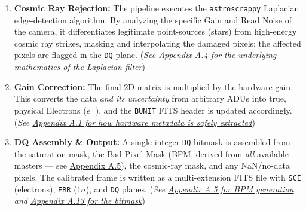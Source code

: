 \documentclass[11pt,a4paper]{article}
\begin{document}
\begin{enumerate}
    \item \textbf{Cosmic Ray Rejection:} The pipeline executes the \texttt{astroscrappy} Laplacian edge-detection algorithm. By analyzing the specific Gain and Read Noise of the camera, it differentiates legitimate point-sources (stars) from high-energy cosmic ray strikes, masking and interpolating the damaged pixels; the affected pixels are flagged in the \texttt{DQ} plane. (\textit{See \hyperref[app:cosmic]{Appendix A.4 for the underlying mathematics of the Laplacian filter}})
    \item \textbf{Gain Correction:} The final 2D matrix is multiplied by the hardware gain. This converts the data \emph{and its uncertainty} from arbitrary ADUs into true, physical Electrons ($e^-$), and the \texttt{BUNIT} FITS header is updated accordingly. (\textit{See \hyperref[app:adapter]{Appendix A.1 for how hardware metadata is safely extracted}})
    \item \textbf{DQ Assembly \& Output:} A single integer \texttt{DQ} bitmask is assembled from the saturation mask, the Bad-Pixel Mask (BPM, derived from \emph{all} available masters --- see \hyperref[app:bpm]{Appendix A.5}), the cosmic-ray mask, and any NaN/no-data pixels. The calibrated frame is written as a multi-extension FITS file with \texttt{SCI} (electrons), \texttt{ERR} ($1\sigma$), and \texttt{DQ} planes. (\textit{See \hyperref[app:bpm]{Appendix A.5 for BPM generation} and \hyperref[app:dqmask]{Appendix A.13 for the bitmask}})
\end{enumerate}

\newpage
\end{document}
